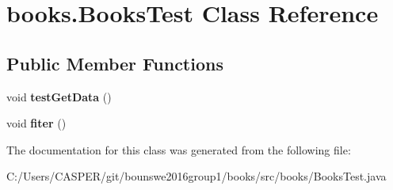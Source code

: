 \hypertarget{classbooks_1_1_books_test}{}\section{books.\+Books\+Test Class Reference}
\label{classbooks_1_1_books_test}
\subsection*{Public Member Functions}
\begin{DoxyCompactItemize}
\item 
void {\bfseries test\+Get\+Data} ()\hypertarget{classbooks_1_1_books_test_a8f40f1862da7acf06546fdf776c44c64}{}\label{classbooks_1_1_books_test_a8f40f1862da7acf06546fdf776c44c64}

\item 
void {\bfseries fiter} ()\hypertarget{classbooks_1_1_books_test_aa4f022ea7b7ba089f755aabdc57cd4c2}{}\label{classbooks_1_1_books_test_aa4f022ea7b7ba089f755aabdc57cd4c2}

\end{DoxyCompactItemize}


The documentation for this class was generated from the following file\+:\begin{DoxyCompactItemize}
\item 
C\+:/\+Users/\+C\+A\+S\+P\+E\+R/git/bounswe2016group1/books/src/books/Books\+Test.\+java\end{DoxyCompactItemize}
